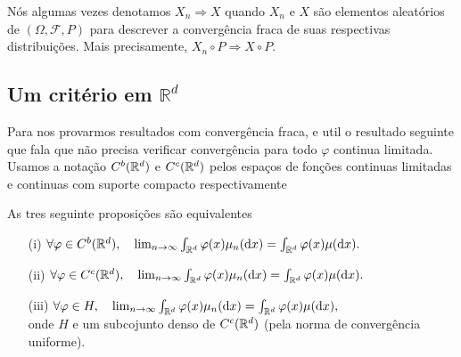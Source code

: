 Nós algumas vezes denotamos $X_n \Rightarrow X$ quando $X_n$ e $X$ são elementos aleatórios de $(\Omega, \mathcal{F}, P)$ para descrever a convergência fraca de suas respectivas distribuições.
Mais precisamente, $X_n \circ P \Rightarrow X \circ P$.

\subsection{Um critério em $\mathbb{R}^d$}

Para nos provarmos resultados com convergência fraca,
e util o resultado seguinte que fala que não precisa verificar convergência para todo $\varphi$ continua limitada.
Usamos a notação $C^b({\mathbb R}^d)$ e $C^c({\mathbb R}^d)$ pelos espaços de fonções continuas limitadas e continuas com suporte compacto respectivamente

\begin{proposition}\label{prop:dafunca}
As tres seguinte proposições são equivalentes
\begin{itemize}
 \item [(i)] $\forall \varphi \in C^b({\mathbb R}^d), \quad \lim_{n\to \infty} \int_{{\mathbb R}^d} \varphi(x)\mu_n(\mathrm{d} x)= \int_{{\mathbb R}^d} \varphi(x)\mu(\mathrm{d} x).$
 \item [(ii)] $\forall \varphi \in C^c({\mathbb R}^d), \quad \lim_{n\to \infty} \int_{{\mathbb R}^d} \varphi(x)\mu_n(\mathrm{d} x)= \int_{{\mathbb R}^d} \varphi(x)\mu(\mathrm{d} x).$
  \item [(iii)] $\forall \varphi \in H, \quad \lim_{n\to \infty} \int_{{\mathbb R}^d} \varphi(x)\mu_n(\mathrm{d} x)= \int_{{\mathbb R}^d} \varphi(x)\mu(\mathrm{d} x),$\\
  onde $H$ e um subcojunto denso de $C^c({\mathbb R}^d)$ (pela norma de convergência uniforme).
\end{itemize}

\end{proposition}

